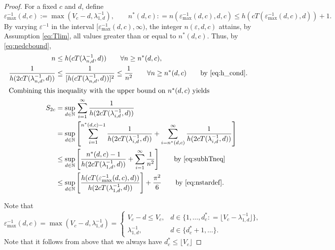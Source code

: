 \documentclass[sort&compress]{elsarticle}
\newcommand{\peter}[1]{\begingroup\color{violet}#1\endgroup}
\begin{document}
\begin{proof}
\peter{
For a fixed $c$ and $d$, define
\begin{equation} \label{eq:nstardef}
	\varepsilon^{-1}_{\max}(d,c) := \max(V_c - d,\lambda_{1,d}^{-1}), \qquad n^*(d,c) : = n(\varepsilon^{-1}_{\max}(d,c),d,c) \le h(cT(\varepsilon^{-1}_{\max}(d,c),d)) +1.
\end{equation}
By varying $\varepsilon^{-1}$ in the interval $[\varepsilon^{-1}_{\max}(d,c),\infty)$,  the integer $n(\varepsilon,d,c)$ attains, \peter{by Assumption \eqref{eq:Tlim},} all values greater than or equal to $n^*(d,c)$.  Thus, by \eqref{eq:nedcbound},
\begin{align}
		n &\le h(cT(\lambda^{-1}_{n,d},d)) \qquad  \forall n \ge n^*(d,c), \label{eq:subhTneq}\\
		\nonumber
		\frac{1}{h(2 cT(\lambda^{-1}_{n,d},d)) } & \le \frac{1}{[h(cT(\lambda^{-1}_{n,d},d))]^{2}}  \le \frac 1{n^2}   \qquad  \forall n \ge n^*(d,c) \qquad \text{by \eqref{eq:h_cond}}. \\
		\intertext{Combining this inequality with the upper bound on $n^*(d,c)$ yields}
		\nonumber
		S_{2c} & =\sup_{d\in\mathbb{N}}  \, \sum_{i=1}^\infty \frac1{h(2cT(\lambda_{i,d}^{-1},d))} \\
		\nonumber
		&  = \sup_{d\in\mathbb{N}} \left [
		\sum_{i=1}^{n^*(d,c)-1} \frac1{h(2cT(\lambda_{i,d}^{-1},d))}
		+ \sum_{i=n^*(d,c)}^\infty \frac1{h(2cT(\lambda_{i,d}^{-1},d))}
		\right]\\
		 \nonumber
		 & \le \sup_{d\in\mathbb{N}} \left [
\frac{n^*(d,c)-1}{h(2cT(\lambda_{1,d}^{-1},d))}
+ \sum_{i=1}^\infty \frac1{n^2}
\right]
 \qquad \text{by \eqref{eq:subhTneq}}\\
 \label{eq:lastone}
		 & \le \sup_{d\in\mathbb{N}} \left [
		 \frac{ h(cT(\varepsilon^{-1}_{\max}(d,c),d))}{h(2cT(\lambda_{1,d}^{-1},d))}
		\right] + \frac{\pi^2}{6}
		\qquad \text{by \eqref{eq:nstardef}.}
\end{align}

Note that
\[
\varepsilon^{-1}_{\max}(d,c) = \max(V_c - d,\lambda_{1,d}^{-1})
= \begin{cases} V_c - d \le V_c, & d \in \{1, \ldots, d^*_c : = \lfloor V_c - \lambda_{1,d}^{-1} \rfloor\}, \\
\lambda_{1,d}^{-1}, & d \in \{d^*_c+1, \ldots\}.
\end{cases}
\]
Note that it follows from above that we always have $d^*_c\le \lfloor V_c \rfloor$

}
\end{proof}
\end{document}
